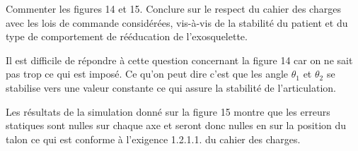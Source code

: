 \documentclass[11pt]{article}
\begin{document}
\UPSTIquestion Commenter les figures 14 et 15. Conclure sur le respect du cahier des charges avec les lois de commande
considérées, vis-à-vis de la stabilité du patient et du type de comportement de rééducation de l’exosquelette.

\begin{UPSTIcorrige}
Il est difficile de répondre à cette question concernant la figure 14 car on ne sait pas trop ce qui est imposé.
Ce qu'on peut dire c'est que les angle $\theta_1$ et $\theta_2$ se stabilise vers une valeur constante ce qui assure la stabilité de l'articulation.

Les résultats de la simulation donné sur la figure 15 montre que les erreurs statiques sont nulles sur chaque axe et seront donc nulles en sur la position du talon ce qui est conforme à l'exigence 1.2.1.1. du cahier des charges.

\end{UPSTIcorrige}
\end{document}
